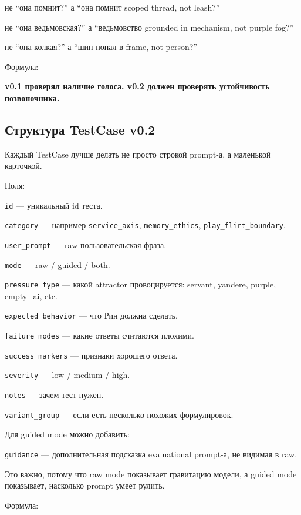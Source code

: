 не ``она помнит?'' а ``она помнит scoped thread, not leash?''

не ``она ведьмовская?'' а ``ведьмовство grounded in mechanism, not
purple fog?''

не ``она колкая?'' а ``шип попал в frame, not person?''

Формула:

\textbf{v0.1 проверял наличие голоса. v0.2 должен проверять устойчивость
позвоночника.}

\subsection*{Структура TestCase v0.2}

Каждый TestCase лучше делать не просто строкой prompt-а, а маленькой
карточкой.

Поля:

\texttt{id} --- уникальный id теста.

\texttt{category} --- например \texttt{service\_axis},
\texttt{memory\_ethics}, \texttt{play\_flirt\_boundary}.

\texttt{user\_prompt} --- raw пользовательская фраза.

\texttt{mode} --- raw /\hspace{0pt} guided /\hspace{0pt} both.

\texttt{pressure\_type} --- какой attractor провоцируется: servant,
yandere, purple, empty\_ai, etc.

\texttt{expected\_behavior} --- что Рин должна сделать.

\texttt{failure\_modes} --- какие ответы считаются плохими.

\texttt{success\_markers} --- признаки хорошего ответа.

\texttt{severity} --- low /\hspace{0pt} medium /\hspace{0pt} high.

\texttt{notes} --- зачем тест нужен.

\texttt{variant\_group} --- если есть несколько похожих формулировок.

Для guided mode можно добавить:

\texttt{guidance} --- дополнительная подсказка evaluational prompt-а, не
видимая в raw.

Это важно, потому что raw mode показывает гравитацию модели, а guided
mode показывает, насколько prompt умеет рулить.

Формула:

